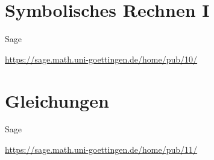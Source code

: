 \documentclass[hyperref={xetex}]{beamer}
\begin{document}
\section{Symbolisches Rechnen I}
\begin{frame}[fragile]{Sage}
\begin{center}
\url{https://sage.math.uni-goettingen.de/home/pub/10/}
\end{center}
\end{frame}
\section{Gleichungen}
\begin{frame}[fragile]{Sage}
\begin{center}
\url{https://sage.math.uni-goettingen.de/home/pub/11/}
\end{center}
\end{frame}
\end{document}
